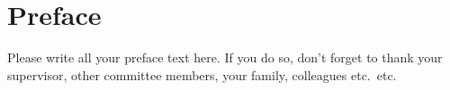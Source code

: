 \chapter*{Preface}\label{chapter:preface}

Please write all your preface text here. If you do so, don't forget to thank your supervisor, other committee members, your family, colleagues etc.\ etc.

